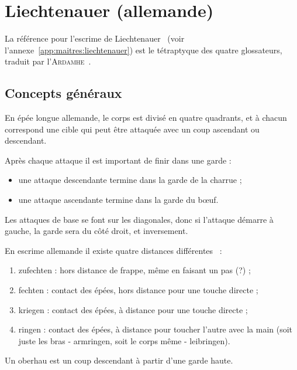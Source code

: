 \section{Liechtenauer (allemande)}
\label{sec:épée-longue:liechtenauer}


La référence pour l'escrime de Liechtenauer~\cite{wiktenauer:liechtenauer} (voir l'annexe~\ref{app:maitres:liechtenauer}) est le tétraptyque des quatre glossateurs, traduit par l'\textsc{Ardamhe}~\cite{ardamhe:tetraptyque}.


\subsection{Concepts généraux}


En épée longue allemande, le corps est divisé en quatre quadrants, et à chacun correspond une cible qui peut être attaquée avec un coup ascendant ou descendant.

Après chaque attaque il est important de finir dans une garde :
\begin{itemize}
	\item une attaque descendante termine dans la garde de la charrue ;
	\item une attaque ascendante termine dans la garde du bœuf.
\end{itemize}
Les attaques de base se font sur les diagonales, donc si l'attaque démarre à gauche, la garde sera du côté droit, et inversement.

En escrime allemande il existe quatre distances différentes~\cite{kronenburg:dijon:going_distance:2015} :
\begin{enumerate}
	\item zufechten : hors distance de frappe, même en faisant un pas (?) ;
	\item fechten : contact des épées, hors distance pour une touche directe ;
	\item kriegen : contact des épées, à distance pour une touche directe ;
	\item ringen : contact des épées, à distance pour toucher l'autre avec la main (soit juste les bras - armringen, soit le corps même - leibringen).
\end{enumerate}



\begin{coup}
\label{épée-longue:coup:oberhau}

Un oberhau est un coup descendant à partir d'une garde haute.

\end{coup}

